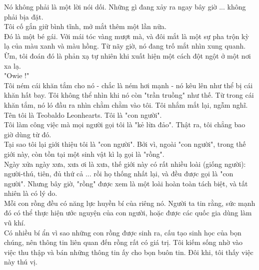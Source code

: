 
	Nó không phải là một lời nói dối. Những gì đang xảy ra ngay bây giờ ... không phải bịa đặt.\\
	
	Tôi cố gắn giữ bình tĩnh, mở mắt thêm một lần nữa.\\
	
	Đó là một bé gái. Với mái tóc vàng mượt mà, và đôi mắt là một sự pha trộn kỳ lạ của màu xanh và màu hồng. Từ nãy giờ, nó đang trố mắt nhìn xung quanh. Ừm, tôi đoán đó là phản xạ tự nhiên khi xuất hiện một cách đột ngột ở một nơi xa lạ.\\
	
	"Owie !"\\
	
	Tôi ném cái khăn tắm cho nó - chắc là ném hơi mạnh - nó kêu lên như thể bị cái khăn hất bay. Tôi không thể nhìn khi nó còn "trần truồng" như thế. Từ trong cái khăn tắm, nó ló đầu ra nhìn chằm chằm vào tôi. Tôi nhắm mắt lại, ngẫm nghĩ. \\
	
	Tên tôi là Teobaldo Leonhearts. Tôi là "con người". \\
	
	Tôi làm công việc mà mọi người gọi tôi là "kẻ lừa đảo". Thật ra, tôi chẳng bao giờ dùng từ đó. \\
	
	Tại sao tôi lại giới thiệu tôi là "con người". Bởi vì, ngoài "con người", trong thế giới này, còn tồn tại một sinh vật kì lạ gọi là "rồng". \\
	
	Ngày xửa ngày xưa, xưa ơi là xưa, thế giới này có rất nhiều loài (giống người): người-thú, tiên, đủ thứ cả ... rồi họ thống nhất lại, và đều được gọi là "con người". Nhưng bây giờ, "rồng" được xem là một loài hoàn toàn tách biệt, và tất nhiên là có lý do. \\
	
	Mỗi con rồng đều có năng lực huyền bí của riêng nó. Người ta tin rằng, sức mạnh đó có thể thực hiện ước nguyện của con người, hoặc được các quốc gia dùng làm vũ khí. \\
	
	Có nhiều bí ẩn vì sao những con rồng được sinh ra, cấu tạo sinh học của bọn chúng, nên thông tin liên quan đến rồng rất có giá trị. Tôi kiếm sống nhờ vào việc thu thập và bán những thông tin ấy cho bọn buôn tin. Đôi khi, tôi thấy việc này thú vị. \\
	
